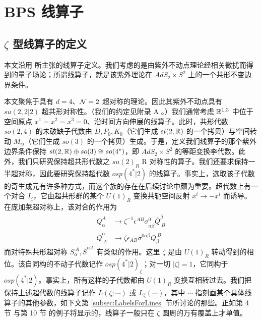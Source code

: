 
\section{BPS 线算子}
\label{sec:Susy-BPS-line}

\subsection{$\zeta$ 型线算子的定义}

本文沿用 \cite{Kapustin:2005py,Kapustin:2006pk} 所主张的线算子定义。我们考虑的是由紫外不动点理论经相关微扰而得到的量子场论；所谓线算子，就是该紫外理论在 $AdS_2\times S^2$ 上的一个共形不变边界条件。

本文聚焦于具有 $d=4$、$\mathcal{N}=2$ 超对称的理论。因此其紫外不动点具有 $su(2,2\vert 2)$ 超共形对称性。（我们的约定见附录 A%
。）我们通常考虑 $\mathbb{R}^{1,3}$ 中位于空间原点 $x^1=x^2=x^3=0$、沿时间方向伸展的线算子。此时，共形代数 $so(2,4)$ 的未破缺子代数由 $D,P_0,K_0$（它们生成 $sl(2,\mathbb{R})$ 的一个拷贝）与空间转动 $M_{ij}$（它们生成 $so(3)$ 的一个拷贝）生成。于是，定义我们线算子的那个紫外边界条件保持 $sl(2,\mathbb{R})\oplus so(3)\cong so(4^*)$，即 $AdS_2\times S^2$ 的等距变换李代数。此外，我们只研究保持超共形代数之 $su(2)_R$ R 对称性的算子。我们还要求保持一半超对称，因此要研究保持超代数 $osp(4^*\vert 2)$ 的线算子。事实上，选取该子代数的奇生成元有许多种方式，而这个族的存在在后续讨论中颇为重要。超代数上有一个对合 $I_\zeta$，它由超共形群的某个 $U(1)_R$ 变换共轭空间反射 $x^i\to -x^i$ 而诱导。在庞加莱超对称上，该对合的作用为
\begin{equation}
\begin{split}
Q_\alpha^A & \rightarrow \zeta^{-1}  \epsilon^{AB}
\sigma^0_{\alpha\dot \beta}\bar
Q^{\dot \beta}_{~ B} \\
\bar Q^{\dot \alpha}_{~ A} & \rightarrow  \zeta  \epsilon_{AB}
\bar\sigma^{0 \dot \alpha\beta} Q_\beta^{~B}
\end{split}
\end{equation}
而对特殊共形超对称 $S_\alpha^{~A},\bar S^{\dot \alpha A}$ 有类似的作用。这里 $\zeta$ 是由 $U(1)_R$ 转动得到的相位。该自同构的不动子代数记作 $osp(4^*\vert 2)_\zeta$；对一切 $|\zeta|=1$，它同构于 $osp(4^*\vert 2)$。事实上，所有这样的子代数都由 $U(1)_R$ 变换互相转过去。我们把保持上述超代数的线算子记作 $L(\zeta;\cdots)$ 或 $L_\zeta(\cdots)$，其中 $\cdots$ 指刻画某个具体线算子的其他参数，如下文第 \ref{subsec:LabelsForLines} 节所讨论的那些。正如第 4 节%
与第 10 节%
的例子将显示的，线算子一般只在 $\zeta$ 圆周的万有覆盖上才单值。


